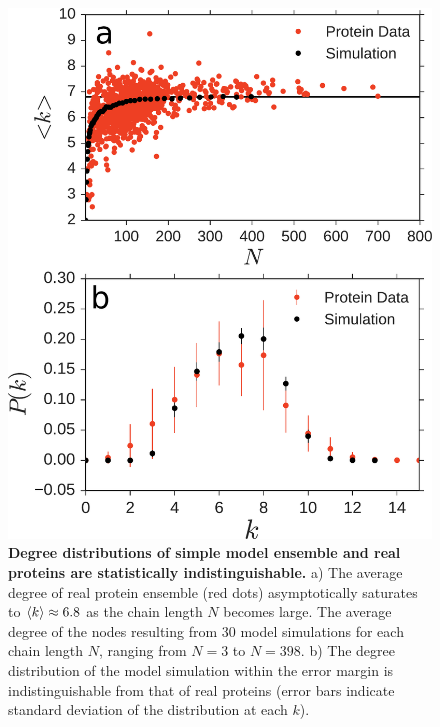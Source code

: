 \documentclass[9pt]{elife}
\DeclarePairedDelimiter{\evdel}{\langle}{\rangle}
\begin{document}
\begin{figure}[h]
        \centering
	\includegraphics[width=0.8\columnwidth]{degdistk}
        \caption{\textbf{Degree distributions of simple model ensemble and real proteins are statistically indistinguishable.} a) The average degree of real protein ensemble (red dots) asymptotically saturates to $\evdel{k}\approx 6.8$ as the chain length $N$ becomes large. The average degree of the nodes resulting from 30 model simulations for each chain length $N$, ranging from $N=3$ to $N=398$. b) The degree distribution of the model simulation within the error margin is indistinguishable from that of real proteins (error bars indicate standard deviation of the distribution at each $k$).} 
        \label{fig.kN}
\end{figure}
\end{document}
